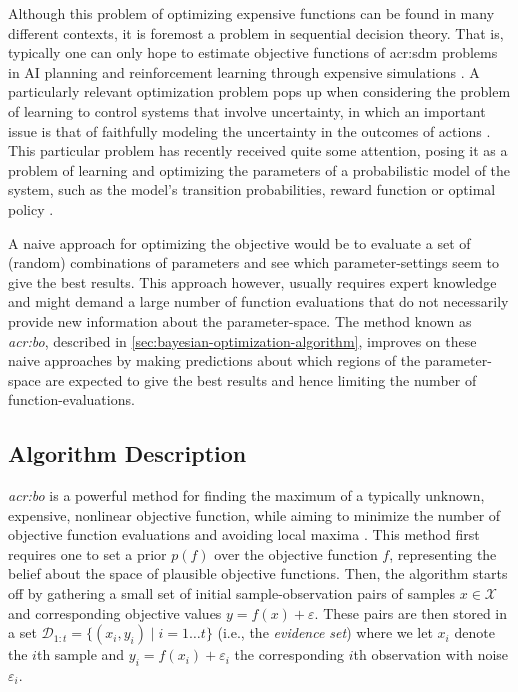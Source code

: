 Although this problem of optimizing expensive functions can be found in many different contexts, it is foremost a problem in sequential decision theory. 
That is, typically one can only hope to estimate objective functions of \acrshort{acr:sdm} problems in AI planning and reinforcement learning through expensive simulations \cite{Brochu2010}. 
A particularly relevant optimization problem pops up when considering the problem of learning to control systems that involve uncertainty, in which an important issue is that of faithfully modeling the uncertainty in the outcomes of actions \cite{Ghahramani2015}.
This particular problem has recently received quite some attention, posing it as a problem of learning and optimizing the parameters of a probabilistic model of the system, such as the model's transition probabilities, reward function or optimal policy \cite{Poupart2010}.

A naive approach for optimizing the objective would be to evaluate a set of (random) combinations of parameters and see which parameter-settings seem to give the best results.
This approach however, usually requires expert knowledge and might demand a large number of function evaluations that do not necessarily provide new information about the parameter-space.
The method known as \textit{\acrlong{acr:bo}}, described in \autoref{sec:bayesian-optimization-algorithm}, improves on these naive approaches by making predictions about which regions of the parameter-space are expected to give the best results and hence limiting the number of function-evaluations.

\subsection{Algorithm Description}
\label{sec:bayesian-optimization-algorithm}

\textit{\acrfull{acr:bo}} is a powerful method for finding the maximum of a typically unknown, expensive, nonlinear objective function, while aiming to minimize the number of objective function evaluations and avoiding local maxima \cite{Brochu2010}.
This method first requires one to set a prior $p(f)$ over the objective function $f$, representing the belief about the space of plausible objective functions.
Then, the algorithm starts off by gathering a small set of initial sample-observation pairs of samples $x \in \mathcal{X}$ and corresponding objective values $y = f(x) + \varepsilon$.
These pairs are then stored in a set $\mathcal{D}_{1:t} = \{(x_i, y_i) \mid i = 1 \ldots t\}$ (i.e., the \textit{evidence set}) where we let $x_i$ denote the $i$th sample and $y_i = f(x_i) + \varepsilon_i$ the corresponding $i$th observation with noise $\varepsilon_i$.

